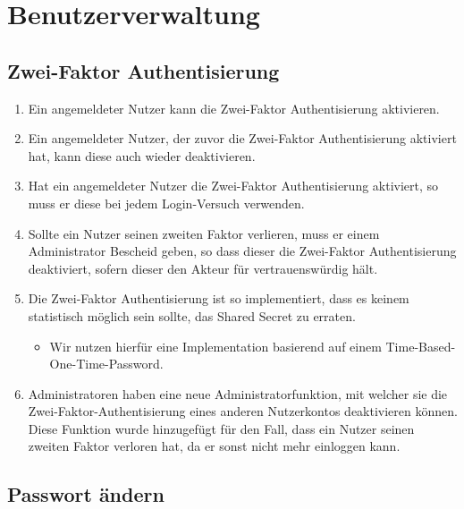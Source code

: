 \documentclass[12pt,DIV14,BCOR10mm,a4paper,parskip=half-,headsepline,headinclude,english,ngerman,bibliography=totocnumbered]{scrreprt}
\begin{document}
\vspace*{-3cm}

\clearpage

\tableofcontents  %

\clearpage

\chapter{Benutzerverwaltung}

\renewcommand*{\chapterheadstartvskip}{\vspace*{22pt}}

\section{Zwei-Faktor Authentisierung}

\begin{enumerate}
    \item Ein angemeldeter Nutzer kann die Zwei-Faktor Authentisierung aktivieren.
    \item Ein angemeldeter Nutzer, der zuvor die Zwei-Faktor Authentisierung aktiviert hat, kann diese auch wieder deaktivieren.
    \item Hat ein angemeldeter Nutzer die Zwei-Faktor Authentisierung aktiviert, so muss er diese bei jedem Login-Versuch verwenden.
    \item Sollte ein Nutzer seinen zweiten Faktor verlieren, muss er einem Administrator Bescheid geben, so dass dieser die Zwei-Faktor Authentisierung deaktiviert, sofern dieser den Akteur für vertrauenswürdig hält.
    \item Die Zwei-Faktor Authentisierung ist so implementiert, dass es keinem statistisch möglich sein sollte, das Shared Secret zu erraten.
    \begin{itemize}
        \item Wir nutzen hierfür eine Implementation basierend auf einem Time-Based-One-Time-Password.
    \end{itemize}
    \item Administratoren haben eine neue Administratorfunktion, mit welcher sie die Zwei-Faktor-Authentisierung eines anderen Nutzerkontos deaktivieren können. Diese Funktion wurde hinzugefügt für den Fall, dass ein Nutzer seinen zweiten Faktor verloren hat, da er sonst nicht mehr einloggen kann.
\end{enumerate}

\section{Passwort ändern}
\end{document}
